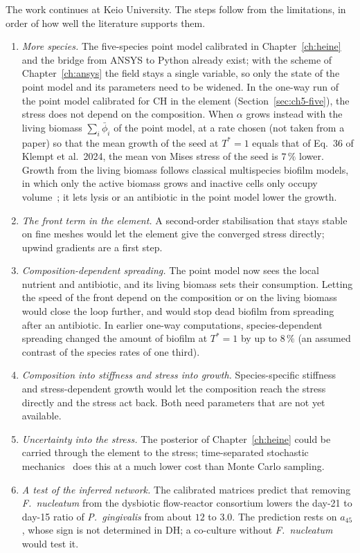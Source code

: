 The work continues at Keio University. The steps follow from the limitations,
in order of how well the literature supports them.
\begin{enumerate}
  \item \emph{More species.} The five-species point model calibrated in
        Chapter~\ref{ch:heine} and the bridge from ANSYS to Python already
        exist; with the scheme of Chapter~\ref{ch:ansys} the field stays a
        single variable, so only the state of the point model and its
        parameters need to be widened. In the one-way run of the point model
        calibrated for CH in the element (Section~\ref{sec:ch5-five}), the
        stress does not depend on the composition. When
        $\alpha$ grows instead with the living biomass
        $\sum_i\bar\phi_i$ of the point model, at a rate chosen (not taken
        from a paper) so that the mean growth of the seed at $T^*=1$ equals
        that of Eq.~36 of Klempt et al.\ 2024, the mean von Mises stress of the
        seed is $7\,\%$ lower. Growth from the living biomass follows classical
        multispecies biofilm models, in which only the active biomass grows and
        inactive cells only occupy volume~\cite{WannerGujer1986}; it lets lysis
        or an antibiotic in the point model lower the growth.
  \item \emph{The front term \fterm{} in the element.} A second-order stabilisation
        that stays stable on fine meshes would let the element give the converged
        stress directly; upwind gradients are a first step.
  \item \emph{Composition-dependent spreading.} The point model now sees the
        local nutrient and antibiotic, and its living biomass sets their
        consumption. Letting the speed of the front depend on the composition or
        on the living biomass would close the loop further, and would stop dead
        biofilm from spreading after an antibiotic. In earlier one-way
        computations, species-dependent spreading changed the amount of biofilm at $T^*=1$ by up to $8\,\%$
        (an assumed contrast of the species rates of one third).
  \item \emph{Composition into stiffness and stress into growth.} Species-specific
        stiffness and stress-dependent growth would let the composition reach
        the stress directly and the stress act back. Both need parameters that
        are not yet available.
  \item \emph{Uncertainty into the stress.} The posterior of
        Chapter~\ref{ch:heine} could be carried through the element to the
        stress; time-separated stochastic mechanics~\cite{GeislerJunker2025TSM}
        does this at a much lower cost than Monte Carlo sampling.
  \item \emph{A test of the inferred network.} The calibrated matrices predict
        that removing \textit{F.~nucleatum} from the dysbiotic flow-reactor
        consortium lowers the day-21 to day-15 ratio of \textit{P.~gingivalis} from about $12$ to $3.0$.
        The prediction rests on $a_{45}$, whose sign is not determined in DH; a co-culture without
        \textit{F.~nucleatum} would test it.
\end{enumerate}
